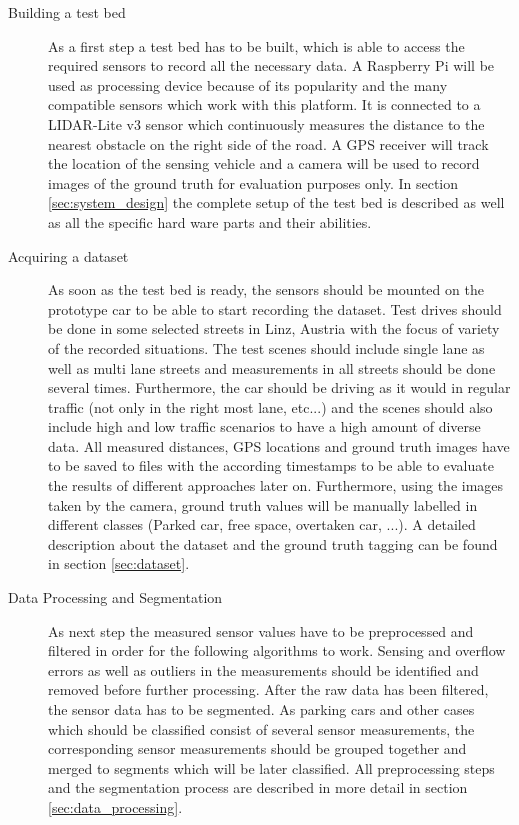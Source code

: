 \begin{description}

\item[Building a test bed] As a first step a test bed has to be built, which is able to access the required sensors to record all the necessary data. A Raspberry Pi will be used as processing device because of its popularity and the many compatible sensors which work with this platform. It is connected to a LIDAR-Lite v3 sensor which continuously measures the distance to the nearest obstacle on the right side of the road. A GPS receiver will track the location of the sensing vehicle and a camera will be used to record images of the ground truth for evaluation purposes only. In section \ref{sec:system_design} the complete setup of the test bed is described as well as all the specific hard ware parts and their abilities.

\item[Acquiring a dataset] As soon as the test bed is ready, the sensors should be mounted on the prototype car to be able to start recording the dataset. Test drives should be done in some selected streets in Linz, Austria with the focus of variety of the recorded situations. The test scenes should include single lane as well as multi lane streets and measurements in all streets should be done several times. Furthermore, the car should be driving as it would in regular traffic (not only in the right most lane, etc...) and the scenes should also include high and low traffic scenarios to have a high amount of diverse data. All measured distances, GPS locations and ground truth images have to be saved to files with the according timestamps to be able to evaluate the results of different approaches later on. Furthermore, using the images taken by the camera, ground truth values will be manually labelled in different classes (Parked car, free space, overtaken car, ...). A detailed description about the dataset and the ground truth tagging can be found in section  \ref{sec:dataset}.

\item[Data Processing and Segmentation] As next step the measured sensor values have to be preprocessed and filtered in order for the following algorithms to work. Sensing and overflow errors as well as outliers in the measurements should be identified and removed before further processing. After the raw data has been filtered, the sensor data has to be segmented. As parking cars and other cases which should be classified consist of several sensor measurements, the corresponding sensor measurements should be grouped together and merged to segments which will be later classified. All preprocessing steps and the segmentation process are described in more detail in section  \ref{sec:data_processing}.


\end{description}
